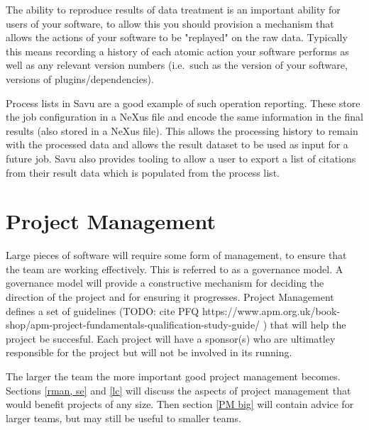 \documentclass[jnr]{iosart2x}
\begin{document}
The ability to reproduce results of data treatment is an important ability for users of your software, to allow this you should provision a mechanism that allows the actions of your software to be "replayed" on the raw data.
Typically this means recording a history of each atomic action your software performs as well as any relevant version numbers (i.e.\ such as the version of your software, versions of plugins/dependencies).

Process lists in Savu \cite{Wadeson_2016} are a good example of such operation reporting.
These store the job configuration in a NeXus file and encode the same information in the final results (also stored in a NeXus file).
This allows the processing history to remain with the processed data and allows the result dataset to be used as input for a future job.
Savu also provides tooling to allow a user to export a list of citations from their result data which is populated from the process list.

\section{Project Management}
\label{Project Management}

Large pieces of software will require some form of management, to ensure that the team are working effectively.
This is referred to as a governance model.
A governance model will provide a constructive mechanism for deciding the direction of the project and for ensuring it progresses.
Project Management defines a set of guidelines (TODO: cite PFQ https://www.apm.org.uk/book-shop/apm-project-fundamentals-qualification-study-guide/ ) that will help the project be succesful.
Each project will have a sponsor(s) who are ultimatley responsible for the project but will not be involved in its running.

The larger the team the more important good project management becomes.
Sections \ref{rman, se} and \ref{lc} will discuss the aspects of project management that would benefit projects of any size.
Then section \ref{PM big} will contain advice for larger teams, but may still be useful to smaller teams.
\end{document}
